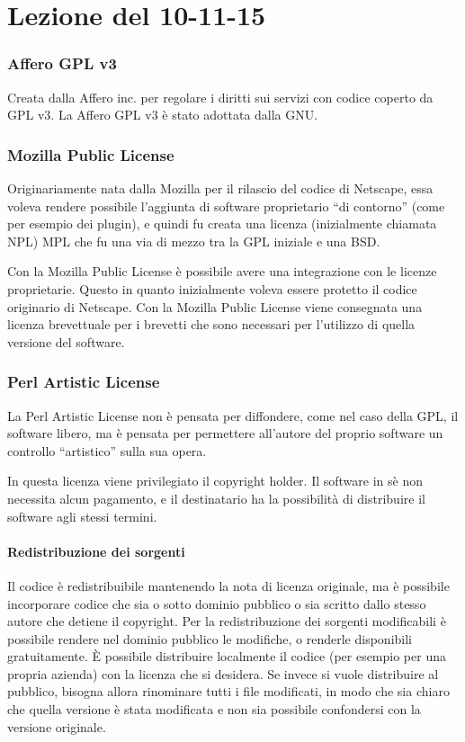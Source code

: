 \section{Lezione del 10-11-15}

\subsubsection{Affero GPL v3}

Creata dalla Affero inc. per regolare i diritti sui servizi con codice coperto da GPL v3. La Affero GPL v3 \`e stato adottata dalla GNU.

\subsubsection{Mozilla Public License}

Originariamente nata dalla Mozilla per il rilascio del codice di Netscape, essa voleva rendere possibile l'aggiunta di software proprietario ``di contorno'' (come per esempio dei plugin), e quindi fu creata una licenza (inizialmente chiamata NPL) MPL che fu una via di mezzo tra la GPL iniziale e una BSD.

Con la Mozilla Public License \`e possibile avere una integrazione con le licenze proprietarie. Questo in quanto inizialmente voleva essere protetto il codice originario di Netscape. Con la Mozilla Public License viene consegnata una licenza brevettuale per i brevetti che sono necessari per l'utilizzo di quella versione del software.

\subsubsection{Perl Artistic License}

La Perl Artistic License non \`e pensata per diffondere, come nel caso della GPL, il software libero, ma \`e pensata per permettere all'autore del proprio software un controllo ``artistico'' sulla sua opera.

In questa licenza viene privilegiato il copyright holder. Il software in s\`e non necessita alcun pagamento, e il destinatario ha la possibilit\`a di distribuire il software agli stessi termini.

\paragraph*{Redistribuzione dei sorgenti}Il codice \`e redistribuibile mantenendo la nota di licenza originale, ma \`e possibile incorporare codice che sia o sotto dominio pubblico o sia scritto dallo stesso autore che detiene il copyright. Per la redistribuzione dei sorgenti modificabili \`e possibile rendere nel dominio pubblico le modifiche, o renderle disponibili gratuitamente. \`E possibile distribuire localmente il codice (per esempio per una propria azienda) con la licenza che si desidera. Se invece si vuole distribuire al pubblico, bisogna allora rinominare tutti i file modificati, in modo che sia chiaro che quella versione \`e stata modificata e non sia possibile confondersi con la versione originale.

